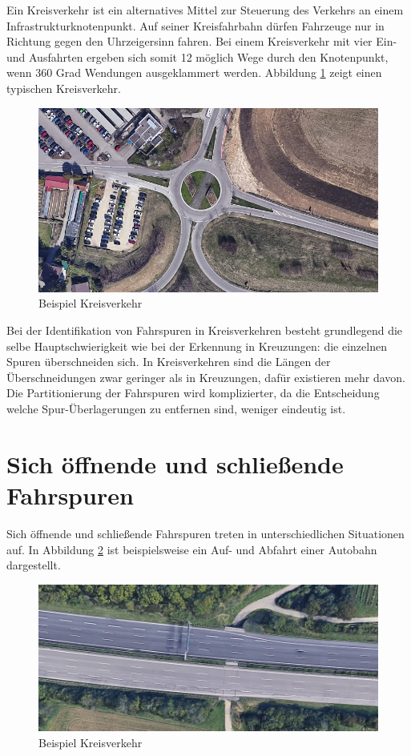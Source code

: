 

Ein Kreisverkehr ist ein alternatives Mittel zur Steuerung des Verkehrs an einem Infrastrukturknotenpunkt.
Auf seiner Kreisfahrbahn dürfen Fahrzeuge nur in Richtung gegen den Uhrzeigersinn fahren. Bei einem
Kreisverkehr mit vier Ein- und Ausfahrten ergeben sich somit 12 möglich Wege durch den Knotenpunkt,
wenn 360 Grad Wendungen ausgeklammert werden. Abbildung \ref{fig:topos_kreisel} zeigt einen typischen
Kreisverkehr.

\begin{figure}[H]
\centering
    \includegraphics[width=0.5\linewidth]{resources/img/topos/kreisverkehr}
\caption{Beispiel Kreisverkehr}
\label{fig:topos_kreisel}
\end{figure}

Bei der Identifikation von Fahrspuren in Kreisverkehren besteht grundlegend die selbe Hauptschwierigkeit
wie bei der Erkennung in Kreuzungen: die einzelnen Spuren überschneiden sich. In Kreisverkehren sind
die Längen der Überschneidungen zwar geringer als in Kreuzungen, dafür existieren mehr davon.
Die Partitionierung der Fahrspuren wird komplizierter, da die Entscheidung welche Spur-Überlagerungen
zu entfernen sind, weniger eindeutig ist.

\section{Sich öffnende und schließende Fahrspuren}

Sich öffnende und schließende Fahrspuren treten in unterschiedlichen Situationen auf. In Abbildung
\ref{fig:topos_opening} ist beispielsweise ein Auf- und Abfahrt einer Autobahn dargestellt.

\begin{figure}[H]
\centering
    \includegraphics[width=0.5\linewidth]{resources/img/topos/opening_lane}
\caption{Beispiel Kreisverkehr}
\label{fig:topos_opening}
\end{figure}

